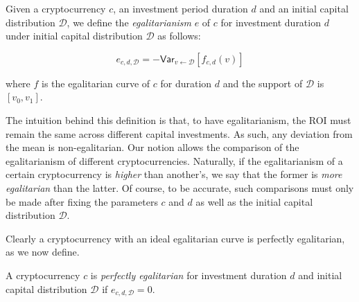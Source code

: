 \begin{definition}[Egalitarianism]
  Given a cryptocurrency $c$, an investment period duration $d$ and an initial
  capital distribution $\mathcal{D}$, we define the \emph{egalitarianism} $e$ of $c$
  for investment duration $d$ under initial capital distribution $\mathcal{D}$
  as follows:

  \[
    e_{c,d,\mathcal{D}} = -\textsf{Var}_{v \gets \mathcal{D}}[f_{c,d}(v)]
  \]

  where $f$ is the egalitarian curve of $c$ for duration $d$ and the support of
  $\mathcal{D}$ is $[v_0, v_1]$.
\end{definition}

The intuition behind this definition is that, to have egalitarianism, the ROI
must remain the same across different capital investments. As such, any
deviation from the mean is non-egalitarian. Our notion allows the comparison of
the egalitarianism of different cryptocurrencies. Naturally, if the
egalitarianism of a certain cryptocurrency is \emph{higher} than another's, we
say that the former is \emph{more egalitarian} than the latter. Of course, to be
accurate, such comparisons must only be made after fixing the parameters $c$
and $d$ as well as the initial capital distribution $\mathcal{D}$.

Clearly a cryptocurrency with an ideal egalitarian curve is perfectly
egalitarian, as we now define.

\begin{definition}
  A cryptocurrency $c$ is \emph{perfectly egalitarian} for investment duration
  $d$ and initial capital distribution $\mathcal{D}$ if
  $e_{c,d,\mathcal{D}} = 0$.
\end{definition}
